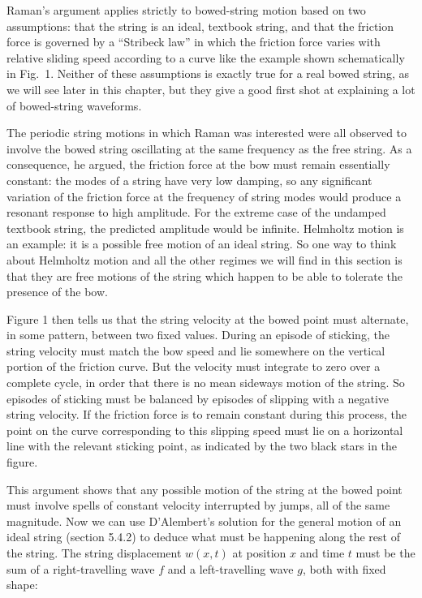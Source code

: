   Raman's argument applies strictly to bowed-string motion based on two 
  assumptions: that the string is an ideal, textbook string, and that the 
  friction force is governed by a ``Stribeck law'' in which the friction force 
  varies with relative sliding speed according to a curve like the example 
  shown schematically in Fig.\ 1. Neither of these assumptions is exactly true 
  for a real bowed string, as we will see later in this chapter, but they give 
  a good first shot at explaining a lot of bowed-string waveforms. 


  The periodic string motions in which Raman was interested were all observed 
  to involve the bowed string oscillating at the same frequency as the free 
  string. As a consequence, he argued, the friction force at the bow must 
  remain essentially constant: the modes of a string have very low damping, so 
  any significant variation of the friction force at the frequency of string 
  modes would produce a resonant response to high amplitude. For the extreme 
  case of the undamped textbook string, the predicted amplitude would be 
  infinite. Helmholtz motion is an example: it is a possible free motion of an 
  ideal string. So one way to think about Helmholtz motion and all the other 
  regimes we will find in this section is that they are free motions of the 
  string which happen to be able to tolerate the presence of the bow. 

  Figure 1 then tells us that the string velocity at the bowed point must 
  alternate, in some pattern, between two fixed values. During an episode of 
  sticking, the string velocity must match the bow speed and lie somewhere on 
  the vertical portion of the friction curve. But the velocity must integrate 
  to zero over a complete cycle, in order that there is no mean sideways motion 
  of the string. So episodes of sticking must be balanced by episodes of 
  slipping with a negative string velocity. If the friction force is to remain 
  constant during this process, the point on the curve corresponding to this 
  slipping speed must lie on a horizontal line with the relevant sticking 
  point, as indicated by the two black stars in the figure. 

  This argument shows that any possible motion of the string at the bowed point 
  must involve spells of constant velocity interrupted by jumps, all of the 
  same magnitude. Now we can use D’Alembert’s solution for the general motion 
  of an ideal string (section 5.4.2) to deduce what must be happening along the 
  rest of the string. The string displacement $w(x,t)$ at position $x$ and time 
  $t$ must be the sum of a right-travelling wave $f$ and a left-travelling wave 
  $g$, both with fixed shape: 

